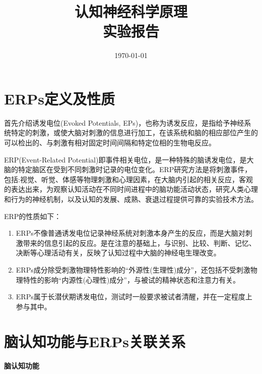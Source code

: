 \documentclass{hitreport}
\title{认知神经科学原理\\实验报告}
\date{\today}
\begin{document}
\maketitle

\tableofcontents
\newpage




\section{ERPs定义及性质}

首先介绍诱发电位(Evoked Potentials, EPs)，也称为诱发反应，是指给予神经系统特定的刺激，或使大脑对刺激的信息进行加工，在该系统和脑的相应部位产生的可以检出的、与刺激有相对固定时间间隔和特定位相的生物电反应\cite{LEGATT2014228}。

ERP(Event-Related Potential)即事件相关电位\cite{Sur2009}，是一种特殊的脑诱发电位，是大脑的特定脑区在受到不同刺激时记录的电位变化。ERP研究方法是将刺激事件，包括:视觉、听觉、体感等物理刺激和心理因素，在大脑内引起的相关反应，客观的表达出来，为观察认知活动在不同时间进程中的脑功能活动状态，研究人类心理和行为的神经机制，以及认知的发展、成熟、衰退过程提供可靠的实验技术方法\cite{Luck2014}。

ERP的性质如下：

\begin{enumerate}
\item ERPs不像普通诱发电位记录神经系统对刺激本身产生的反应，而是大脑对刺激带来的信息引起的反应\cite{Sur2009}。是在注意的基础上，与识别、比较、判断、记忆、决断等心理活动有关，反映了认知过程中大脑的神经电生理改变。
\item ERPs成分除受刺激物理特性影响的“外源性(生理性)成分”，还包括不受刺激物理特性的影响“内源性(心理性)成分”，与被试的精神状态和注意力有关\cite{Luck2014}。
\item ERPs属于长潜伏期诱发电位，测试时一般要求被试者清醒，并在一定程度上参与其中。
\end{enumerate}



\section{脑认知功能与ERPs关联关系}

\paragraph{脑认知功能}~{}
\end{document}
